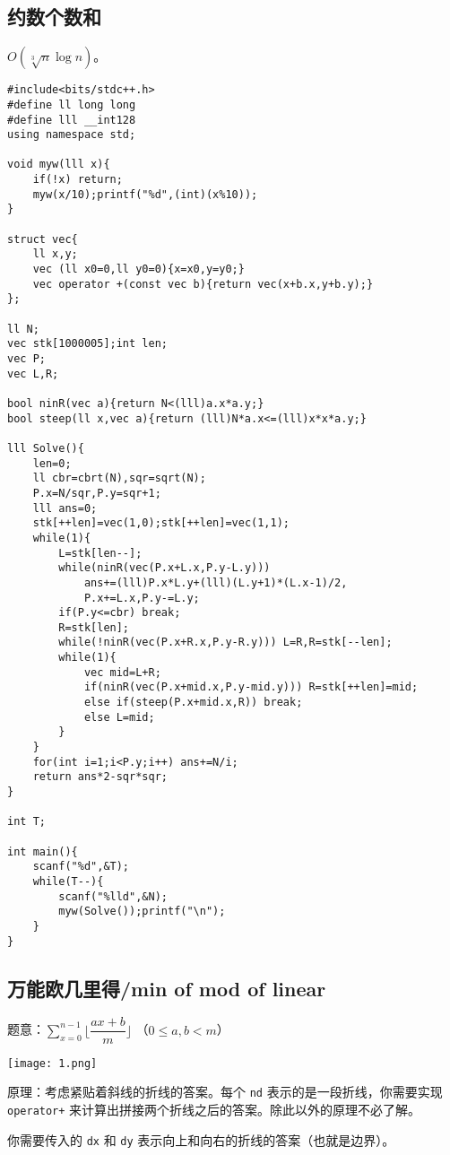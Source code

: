 \documentclass[12pt]{ctexart}
\begin{document}
\subsection{约数个数和}

$O(\sqrt[3]n\log n)$。

\begin{lstlisting}
#include<bits/stdc++.h>
#define ll long long
#define lll __int128
using namespace std;

void myw(lll x){
	if(!x) return;
	myw(x/10);printf("%d",(int)(x%10));
}

struct vec{
	ll x,y;
	vec (ll x0=0,ll y0=0){x=x0,y=y0;}
	vec operator +(const vec b){return vec(x+b.x,y+b.y);}
};

ll N;
vec stk[1000005];int len;
vec P;
vec L,R; 

bool ninR(vec a){return N<(lll)a.x*a.y;}
bool steep(ll x,vec a){return (lll)N*a.x<=(lll)x*x*a.y;}

lll Solve(){
	len=0;
	ll cbr=cbrt(N),sqr=sqrt(N);
	P.x=N/sqr,P.y=sqr+1;
	lll ans=0;
	stk[++len]=vec(1,0);stk[++len]=vec(1,1);
	while(1){
		L=stk[len--];
		while(ninR(vec(P.x+L.x,P.y-L.y)))
			ans+=(lll)P.x*L.y+(lll)(L.y+1)*(L.x-1)/2,
			P.x+=L.x,P.y-=L.y;
		if(P.y<=cbr) break;
		R=stk[len];
		while(!ninR(vec(P.x+R.x,P.y-R.y))) L=R,R=stk[--len];
		while(1){
			vec mid=L+R;
			if(ninR(vec(P.x+mid.x,P.y-mid.y))) R=stk[++len]=mid;
			else if(steep(P.x+mid.x,R)) break;
			else L=mid;
		}
	}
	for(int i=1;i<P.y;i++) ans+=N/i;
	return ans*2-sqr*sqr;
}

int T;

int main(){
	scanf("%d",&T);
	while(T--){
		scanf("%lld",&N);
		myw(Solve());printf("\n");
	}
}
\end{lstlisting}



\subsection{万能欧几里得/min of mod of linear}

题意：$\sum\limits_{x=0}^{n-1}\lfloor \dfrac {ax+b}m\rfloor$ （$0\le a,b<m$）

\texttt{[image: 1.png]}

原理：考虑紧贴着斜线的折线的答案。每个 \verb|nd| 表示的是一段折线，你需要实现 \verb|operator+| 来计算出拼接两个折线之后的答案。除此以外的原理不必了解。

你需要传入的 \verb|dx| 和 \verb|dy| 表示向上和向右的折线的答案（也就是边界）。
\end{document}
